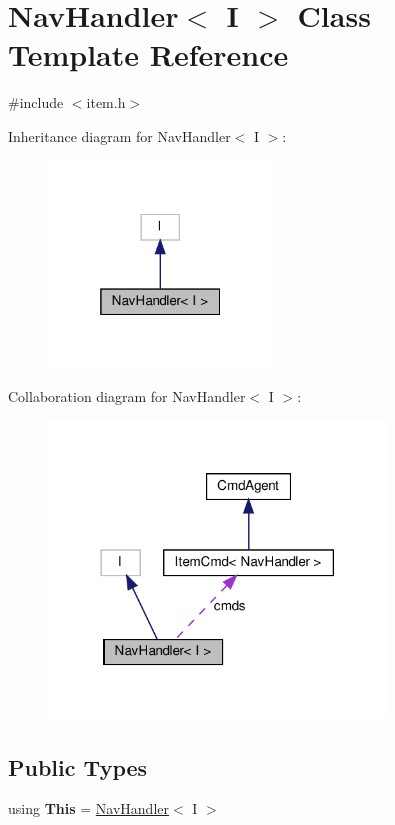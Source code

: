 \hypertarget{classNavHandler}{}\section{Nav\+Handler$<$ I $>$ Class Template Reference}
\label{classNavHandler}


{\ttfamily \#include $<$item.\+h$>$}



Inheritance diagram for Nav\+Handler$<$ I $>$\+:\nopagebreak
\begin{figure}[H]
\begin{center}
\leavevmode
\includegraphics[width=169pt]{classNavHandler__inherit__graph}
\end{center}
\end{figure}


Collaboration diagram for Nav\+Handler$<$ I $>$\+:\nopagebreak
\begin{figure}[H]
\begin{center}
\leavevmode
\includegraphics[width=254pt]{classNavHandler__coll__graph}
\end{center}
\end{figure}
\subsection*{Public Types}
\begin{DoxyCompactItemize}
\item 
\mbox{\label{classNavHandler_a40be7497810e8f3660d19a4345bcdd80}} 
using {\bfseries This} = \hyperlink{classNavHandler}{Nav\+Handler}$<$ I $>$
\end{DoxyCompactItemize}
